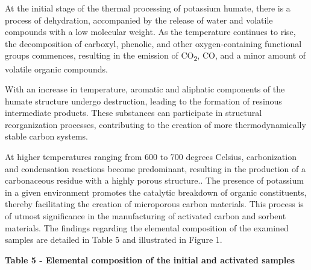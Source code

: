 At the initial stage of the thermal processing of potassium humate,
there is a process of dehydration, accompanied by the release of water
and volatile compounds with a low molecular weight. As the temperature
continues to rise, the decomposition of carboxyl, phenolic, and other
oxygen-containing functional groups commences, resulting in the emission
of CO\textsubscript{2}, CO, and a minor amount of volatile organic
compounds.

With an increase in temperature, aromatic and aliphatic components of
the humate structure undergo destruction, leading to the formation of
resinous intermediate products. These substances can participate in
structural reorganization processes, contributing to the creation of
more thermodynamically stable carbon systems.

At higher temperatures ranging from 600 to 700 degrees Celsius,
carbonization and condensation reactions become predominant, resulting
in the production of a carbonaceous residue with a highly porous
structure.. The presence of potassium in a given environment promotes
the catalytic breakdown of organic constituents, thereby facilitating
the creation of microporous carbon materials. This process is of utmost
significance in the manufacturing of activated carbon and sorbent
materials. The findings regarding the elemental composition of the
examined samples are detailed in Table 5 and illustrated in Figure 1.

{\bfseries Table 5 - Elemental composition of the initial and activated
samples}

